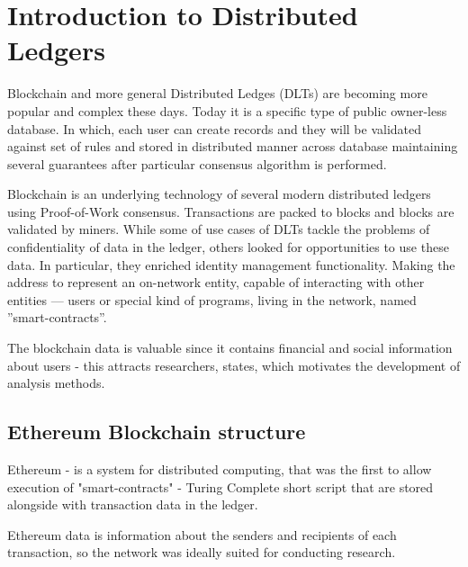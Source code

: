 \Introduction

\section{Introduction to Distributed Ledgers}
Blockchain and more general Distributed Ledges (DLTs) are becoming more popular and complex these days. Today it is a specific type of public owner-less database. In which, each user can create records and they will be validated against set of rules and stored in distributed manner across database maintaining several guarantees after particular consensus algorithm is performed.

Blockchain is an underlying technology of several modern distributed ledgers using Proof-of-Work consensus. Transactions are packed to blocks and blocks are validated by miners. While some of use cases of DLTs tackle the problems of confidentiality of data in the ledger, others looked for opportunities to use these data. In particular, they enriched identity management functionality. Making the address to represent an on-network entity, capable of interacting with other entities — users or special kind of programs, living in the network, named ”smart-contracts”.

The blockchain data is valuable since it contains financial and social information about users - this attracts researchers, states, which motivates the development of analysis methods.

\subsection{Ethereum Blockchain structure}
Ethereum - is a system for distributed computing, that was the first to allow execution of "smart-contracts" - Turing Complete short script that are stored alongside with transaction data in the ledger. 

Ethereum data is information about the senders and recipients of each transaction, so the network was ideally suited for conducting research.
\\

